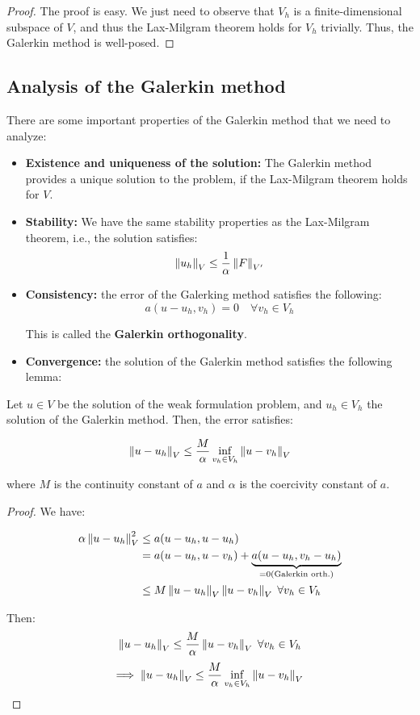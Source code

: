 \begin{proof}
    The proof is easy. We just need to observe that $V_h$ is a finite-dimensional subspace of $V$, and thus
    the Lax-Milgram theorem holds for $V_h$ trivially. Thus, the Galerkin method is well-posed. 
\end{proof}

\subsection{Analysis of the Galerkin method}

There are some important properties of the Galerkin method that we need to analyze:

\begin{itemize}
    \item \textbf{Existence and uniqueness of the solution:} The Galerkin method provides a unique solution
    to the problem, if the Lax-Milgram theorem holds for $V$.

    \item \textbf{Stability:} We have the same stability properties as the Lax-Milgram theorem, i.e., the solution
    satisfies:
    $$\left\|u_h\right\|_V \leq \frac{1}{\alpha} \left\|F\right\|_{V'}$$

    \item \textbf{Consistency:} the error of the Galerking method satisfies the following:
    $$a(u - u_h, v_h) = 0 \quad \forall v_h \in V_h$$

    This is called the \textbf{Galerkin orthogonality}.

    \item \textbf{Convergence:} the solution of the Galerkin method satisfies the following lemma:
\end{itemize}

\begin{flemma}
    Let $u \in V$ be the solution of the weak formulation problem, and $u_h \in V_h$ the solution of the Galerkin method.
    Then, the error satisfies:

    $$\left\|u - u_h\right\|_V \leq \frac{M}{\alpha} \inf_{v_h \in V_h} \left\|u - v_h\right\|_V$$

    where $M$ is the continuity constant of $a$ and $\alpha$ is the coercivity constant of $a$.
\end{flemma}

\begin{proof}
    We have:

    \begin{align*}
        \alpha \left\|u - u_h\right\|_V^2 &\leq a(u - u_h, u - u_h) \\
        &= a(u - u_h, u - v_h) + \underbrace{a(u - u_h, v_h - u_h)}_{= 0 (\text{Galerkin orth.})} \\
        &\leq M \left\|u - u_h\right\|_V \left\|u - v_h\right\|_V \; \forall v_h \in V_h
    \end{align*}

    Then:
    $$\left\|u - u_h\right\|_V \leq \frac{M}{\alpha} \left\|u - v_h\right\|_V \; \forall v_h \in V_h$$
    $$\Longrightarrow \; \left\|u - u_h\right\|_V \leq \frac{M}{\alpha} \inf_{v_h \in V_h} \left\|u - v_h\right\|_V$$

\end{proof}

